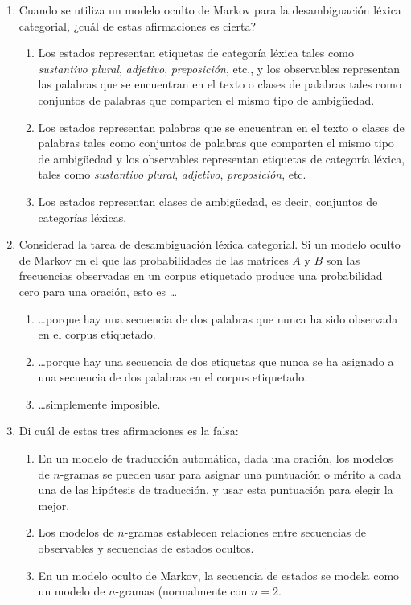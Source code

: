 \documentclass[12pt,a4paper]{article}
\begin{document}
\begin{enumerate}
\item Cuando se utiliza un modelo oculto de Markov para la desambiguación léxica categorial, ¿cuál de estas afirmaciones es cierta?
  \begin{enumerate}
  \item Los estados representan etiquetas de categoría léxica tales
    como \emph{sustantivo plural}, \emph{adjetivo},
    \emph{preposición}, etc., y los observables representan las
    palabras que se encuentran en el texto o clases de palabras tales
    como conjuntos de palabras que comparten el mismo tipo de
    ambigüedad.
  \item Los estados representan palabras que se encuentran en el texto
    o clases de palabras tales como conjuntos de palabras que
    comparten el mismo tipo de ambigüedad y los observables representan
    etiquetas de categoría léxica,  tales como \emph{sustantivo plural}, \emph{adjetivo},
    \emph{preposición}, etc.
  \item Los estados representan clases de ambigüedad, es decir,
    conjuntos de categorías léxicas.
  \end{enumerate}


\item Considerad la tarea de desambiguación léxica categorial. Si un
  modelo oculto de Markov en el que las probabilidades de las matrices
  \(A\)
  y \(B\)
  son las frecuencias observadas en un corpus etiquetado produce una
  probabilidad cero para una oración, esto es \ldots
  \begin{enumerate}
  \item \ldots porque hay una secuencia de dos palabras que nunca ha
    sido observada en el corpus etiquetado.  
  \item \ldots porque hay una secuencia de dos etiquetas que nunca se ha
    asignado a una secuencia de dos palabras en el corpus etiquetado.
  \item \ldots simplemente imposible.
  \end{enumerate}

\item Di cuál de estas tres afirmaciones es la falsa:
  \begin{enumerate}
  \item En un modelo de traducción automática, dada una oración, los
    modelos de \(n\)-gramas
    se pueden usar para asignar una puntuación o mérito a cada una de
    las hipótesis de traducción, y usar esta puntuación para elegir la
    mejor.
  \item Los modelos de \(n\)-gramas
    establecen relaciones entre secuencias de observables y secuencias
    de estados ocultos.
  \item En un modelo oculto de Markov, la secuencia de estados se
    modela como un modelo de \(n\)-gramas (normalmente con \(n=2\).
  \end{enumerate}
\end{enumerate}
\end{document}
